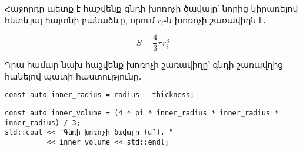 Հաջորդը պետք է հաշվենք գնդի խոռոչի ծավալը՝ նորից կիրառելով հետևյալ 
հայտնի բանաձևը, որում \(r_i\)֊ն խոռոչի շառավիղն է․

\[
S = \frac{4}{3}\pi r_i^3 
\]

Դրա համար նախ հաշվենք խոռոչի շառավիղը՝ գնդի շառավղից հանելով 
պատի հաստությունը․

\begin{Verbatim}
const auto inner_radius = radius - thickness;
\end{Verbatim}

\begin{Verbatim}
const auto inner_volume = (4 * pi * inner_radius * inner_radius * inner_radius) / 3;
std::cout << "Գնդի խոռոչի ծավալը (մ³). "
          << inner_volume << std::endl;
\end{Verbatim}
